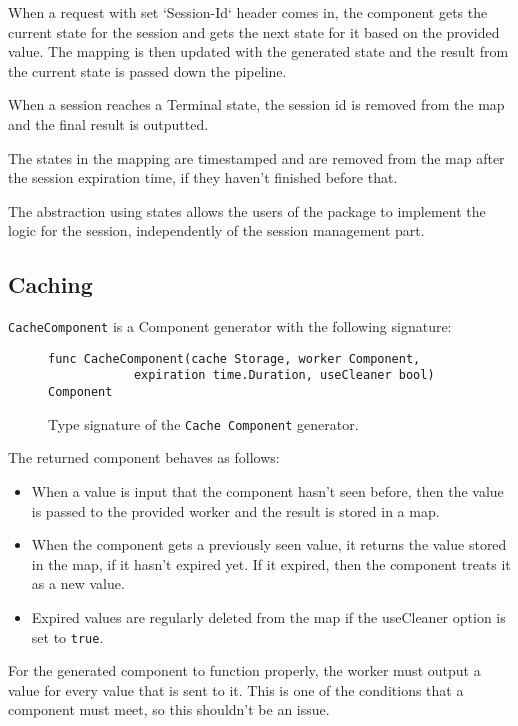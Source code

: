 \documentclass[12pt,a4paper]{article}
\begin{document}
When a request with set `Session-Id` header comes in, the component gets the current 
state for the session and gets the next state for it based on the provided value.
The mapping is then updated with the generated state and the result from the current state
is passed down the pipeline.

When a session reaches a Terminal state, the session id is removed from the map
and the final result is outputted.

The states in the mapping are timestamped and are removed from the map after
the session expiration time, if they haven't finished before that.

The abstraction using states allows the users of the package to implement the
logic for the session, independently of the session management part.

\subsection{Caching}
\texttt{CacheComponent} is a Component generator with the following signature:
\begin{figure}[h]
\centering
\begin{lstlisting}
func CacheComponent(cache Storage, worker Component, 
            expiration time.Duration, useCleaner bool) Component
\end{lstlisting}
\caption[scale=1.0]{Type signature of the \texttt{Cache Component} generator.}
\label{fig:cacheComp}
\end{figure}

The returned component behaves as follows:
\begin{itemize}
	\item When a value is input that the component hasn't seen before, then
		  the value is passed to the provided worker and the result is stored in
		  a map.
	\item When the component gets a previously seen value, it returns the value
		  stored in the map, if it hasn't expired yet. If it expired, then the component
		  treats it as a new value.
	\item Expired values are regularly deleted from the map if the useCleaner
          option is set to \texttt{true}.
\end{itemize}

For the generated component to function properly, the worker must output
a value for every value that is sent to it. This is one of the conditions
that a component must meet, so this shouldn't be an issue.
\end{document}
